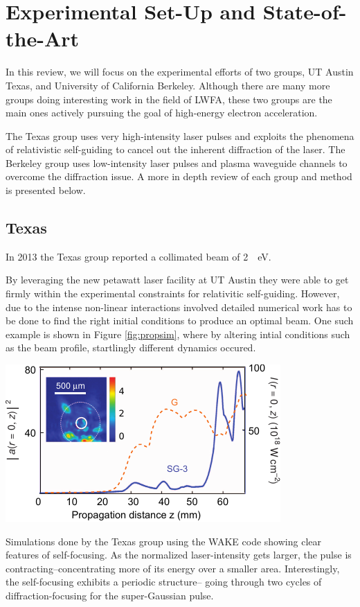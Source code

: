 \documentclass[12pt,letter]{article}
\begin{document}
  \section{Experimental Set-Up and State-of-the-Art}
In this review, we will focus on the experimental efforts of two groups, UT
Austin Texas, and University of California Berkeley. Although there are many
more groups doing interesting work in the field of LWFA, these two groups are
the main ones actively pursuing the goal of high-energy electron
acceleration.

The Texas group uses very high-intensity laser pulses and exploits the
phenomena of relativistic self-guiding to cancel out the inherent diffraction
of the laser. The Berkeley group uses low-intensity laser pulses and plasma waveguide channels to overcome the diffraction issue. A more in depth review of
each group and method is presented below. 


\subsection{Texas}

In 2013 the Texas group reported a collimated beam of \SI{2}{\giga
\electronvolt}\cite{Wang2013}.

By leveraging the new petawatt laser facility at UT Austin they were able to get
firmly within the experimental constraints for relativitic self-guiding.
However, due to the intense non-linear interactions involved detailed numerical
work has to be done to find the right initial conditions to produce an optimal
beam. One such example is shown in Figure
\ref{fig:propsim}\cite{Wang2013}, where by altering intial conditions such as the beam
profile, startlingly different dynamics occured. 
\begin{marginfigure}
	\includegraphics[width=\marginparwidth]{../figures/wakesimulation.pdf}
    \caption{Simulations done by the Texas group using the WAKE
        code showing clear features of self-focusing.\cite{Wang2013} As the
        normalized laser-intensity gets larger, the pulse is
        contracting--concentrating more of its energy over a smaller area.
        Interestingly, the self-focusing exhibits a periodic structure-- going
        through two cycles of diffraction-focusing for the super-Gaussian
    pulse.\label{fig:propsim}}
\end{marginfigure}
\end{document}
